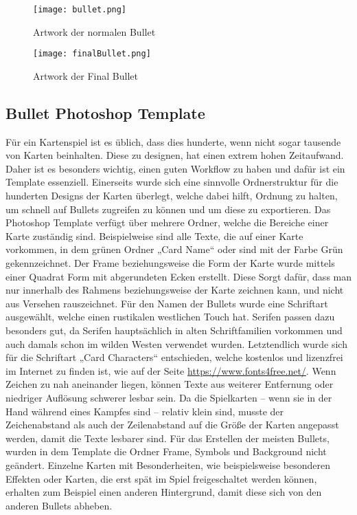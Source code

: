 \begin{figure}[H]
    \centering
    \texttt{[image: bullet.png]}
    \caption{Artwork der normalen Bullet}
\end{figure}

\begin{figure}[H]
    \centering
    \texttt{[image: finalBullet.png]}
    \caption{Artwork der Final Bullet}
\end{figure}

\subsection{Bullet Photoshop Template}

Für ein Kartenspiel ist es üblich, dass dies hunderte, wenn nicht sogar tausende von Karten beinhalten. Diese zu designen, hat einen extrem hohen Zeitaufwand. Daher ist es besonders wichtig, einen guten Workflow zu haben und dafür ist ein Template essenziell. Einerseits wurde sich eine sinnvolle Ordnerstruktur für die hunderten Designs der Karten überlegt, welche dabei hilft, Ordnung zu halten, um schnell auf Bullets zugreifen zu können und um diese zu exportieren. Das Photoshop Template verfügt über mehrere Ordner, welche die Bereiche einer Karte zuständig sind. Beispielweise sind alle Texte, die auf einer Karte vorkommen, in dem grünen Ordner „Card Name“ oder sind mit der Farbe Grün gekennzeichnet. Der Frame beziehungsweise die Form der Karte wurde mittels einer Quadrat Form mit abgerundeten Ecken erstellt. Diese Sorgt dafür, dass man nur innerhalb des Rahmens beziehungsweise der Karte zeichnen kann, und nicht aus Versehen rauszeichnet. Für den Namen der Bullets wurde eine Schriftart ausgewählt, welche einen rustikalen westlichen Touch hat. Serifen passen dazu besonders gut, da Serifen hauptsächlich in alten Schriftfamilien vorkommen und auch damals schon im wilden Westen verwendet wurden. Letztendlich wurde sich für die Schriftart „Card Characters“ entschieden, welche kostenlos und lizenzfrei im Internet zu finden ist, wie auf der Seite \url{https://www.fonts4free.net/}. Wenn Zeichen zu nah aneinander liegen, können Texte aus weiterer Entfernung oder niedriger Auflösung schwerer lesbar sein. Da die Spielkarten – wenn sie in der Hand während eines Kampfes sind – relativ klein sind, musste der Zeichenabstand als auch der Zeilenabstand auf die Größe der Karten angepasst werden, damit die Texte lesbarer sind. Für das Erstellen der meisten Bullets, wurden in dem Template die Ordner Frame, Symbols und Background nicht geändert. Einzelne Karten mit Besonderheiten, wie beispielsweise besonderen Effekten oder Karten, die erst spät im Spiel freigeschaltet werden können, erhalten zum Beispiel einen anderen Hintergrund, damit diese sich von den anderen Bullets abheben.

